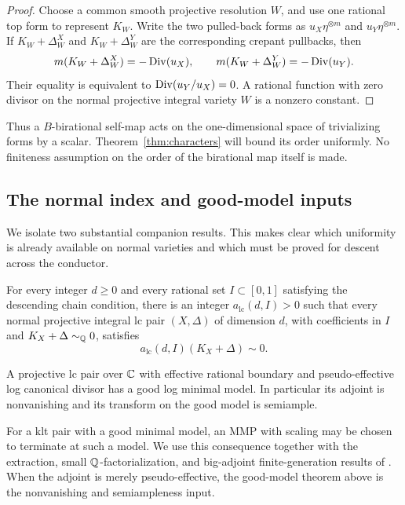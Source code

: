 \begin{proof}
Choose a common smooth projective resolution $W$, and use one rational
top form to represent $K_W$. Write the two pulled-back forms as
$u_X\eta^{\otimes m}$ and $u_Y\eta^{\otimes m}$. If
$K_W+\Delta_W^X$ and $K_W+\Delta_W^Y$ are the corresponding crepant
pullbacks, then
\[
             m(K_W+\Delta_W^X)=-\operatorname{Div}(u_X),\qquad
             m(K_W+\Delta_W^Y)=-\operatorname{Div}(u_Y).
\]
Their equality is equivalent to $\operatorname{Div}(u_Y/u_X)=0$. A rational function
with zero divisor on the normal projective integral variety $W$ is a
nonzero constant.
\end{proof}

Thus a $B$-birational self-map acts on the one-dimensional space of
trivializing forms by a scalar. Theorem~\ref{thm:characters} will bound
its order uniformly. No finiteness assumption on the order of the
birational map itself is made.

\subsection{The normal index and good-model inputs}

We isolate two substantial companion results. This makes clear which
uniformity is already available on normal varieties and which must be
proved for descent across the conductor.

\begin{theorem}
\label{input:normal-index}
For every integer $d\ge0$ and every rational set
$I\subset[0,1]$ satisfying the descending chain condition, there is
an integer $a_{\mathrm{lc}}(d,I)>0$ such that every normal projective
integral lc pair $(X,\Delta)$ of dimension $d$, with coefficients in
$I$ and $K_X+\Delta\sim_{\mathbb Q}0$, satisfies
\[
                       a_{\mathrm{lc}}(d,I)(K_X+\Delta)\sim0.
\]
\end{theorem}

\begin{theorem}
\label{input:good-model}
A projective lc pair over $\mathbb C$ with effective rational boundary and
pseudo-effective log canonical divisor has a good log minimal model.
In particular its adjoint is nonvanishing and its transform on the
good model is semiample.
\end{theorem}

For a klt pair with a good minimal model, an MMP with scaling may be
chosen to terminate at such a model. We use this consequence together
with the extraction, small $\mathbb Q$-factorialization, and big-adjoint
finite-generation results of \citet{BCHM2010}. When the adjoint is merely
pseudo-effective, the good-model theorem above is the nonvanishing
and semiampleness input.

